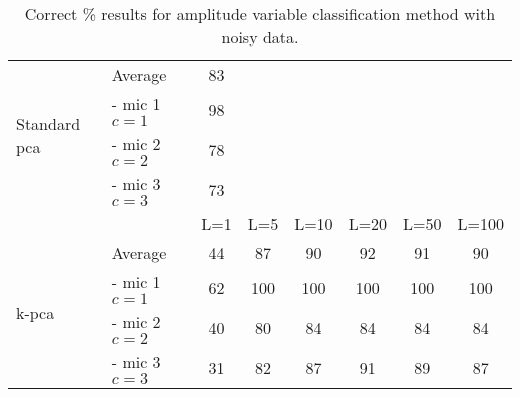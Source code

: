 \begin{table}[t]\begin{center}
\caption{Correct \% results for amplitude variable classification method with noisy data.}
\label{tab:KAPRresultsNoisy}
\begin{tabular}{|l|l|c|c|c|c|c|c|}\cline{1-3}
\multirow{4}{*}{Standard \gls{pca}}   & Average           & 83        & \multicolumn{5}{c}{ } \\ \cline{2-3}
                                & - mic 1 $c = 1$   & 98        & \multicolumn{5}{c}{ } \\
                                & - mic 2 $c = 2$   & 78        & \multicolumn{5}{c}{ } \\
                                & - mic 3 $c = 3$   & 73        & \multicolumn{5}{c}{ } \\ \hline
                                &                   & L=1       & L=5   & L=10  & L=20  & L=50  & L=100 \\ \hline
\multirow{4}{*}{\gls{k-pca}}& Average           & 44        & 87    & 90    & 92    & 91    & 90    \\ \cline{2-8}
                                & - mic 1 $c = 1$   & 62        & 100   & 100   & 100   & 100   & 100   \\
                                & - mic 2 $c = 2$   & 40        & 80    & 84    & 84    & 84    & 84    \\
                                & - mic 3 $c = 3$   & 31        & 82    & 87    & 91    & 89    & 87    \\ \hline
\end{tabular}\end{center}\end{table}


